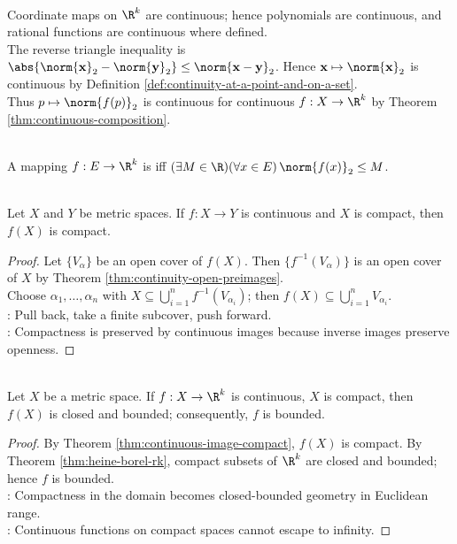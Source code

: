 \begin{example} \label{ex:coordinate-polynomial-rational-norm-continuity} \\
Coordinate maps on $\R^k$ are continuous; hence polynomials are continuous, and rational functions are continuous where defined.\\
The reverse triangle inequality is $\abs{\norm{\mathbf{x}}_2-\norm{\mathbf{y}}_2}\leq\norm{\mathbf{x}-\mathbf{y}}_2$. Hence $\mathbf{x}\mapsto\norm{\mathbf{x}}_2$ is continuous by Definition \ref{def:continuity-at-a-point-and-on-a-set}.\\
Thus $p\mapsto\norm{f(p)}_2$ is continuous for continuous $f:X\to\R^k$ by Theorem \ref{thm:continuous-composition}.
\end{example}

\begin{definition} \label{def:bounded-mapping-into-rk} \\
A mapping $f:E\to\R^k$ is  iff $(\exists M\in\R)(\forall x\in E)\,\norm{f(x)}_2\leq M$.
\end{definition}

\begin{theorem} \label{thm:continuous-image-compact} \\
Let $X$ and $Y$ be metric spaces. If $f:X\to Y$ is continuous and $X$ is compact, then $f(X)$ is compact.
\begin{proof}
Let $\{V_\alpha\}$ be an open cover of $f(X)$. Then $\{f^{-1}(V_\alpha)\}$ is an open cover of $X$ by Theorem \ref{thm:continuity-open-preimages}.\\
Choose $\alpha_1,\ldots,\alpha_n$ with $X\subseteq\bigcup\limits_{i=1}^n f^{-1}(V_{\alpha_i})$; then $f(X)\subseteq\bigcup\limits_{i=1}^n V_{\alpha_i}$.\\
: Pull back, take a finite subcover, push forward.\\
: Compactness is preserved by continuous images because inverse images preserve openness.
\end{proof}
\end{theorem}

\begin{corollary} \label{cor:continuous-rk-image-compact-closed-bounded} \\
Let $X$ be a metric space. If $f:X\to\R^k$ is continuous, $X$ is compact, then $f(X)$ is closed and bounded; consequently, $f$ is bounded.
\begin{proof}
By Theorem \ref{thm:continuous-image-compact}, $f(X)$ is compact. By Theorem \ref{thm:heine-borel-rk}, compact subsets of $\R^k$ are closed and bounded; hence $f$ is bounded.\\
: Compactness in the domain becomes closed-bounded geometry in Euclidean range.\\
: Continuous functions on compact spaces cannot escape to infinity.
\end{proof}
\end{corollary}

